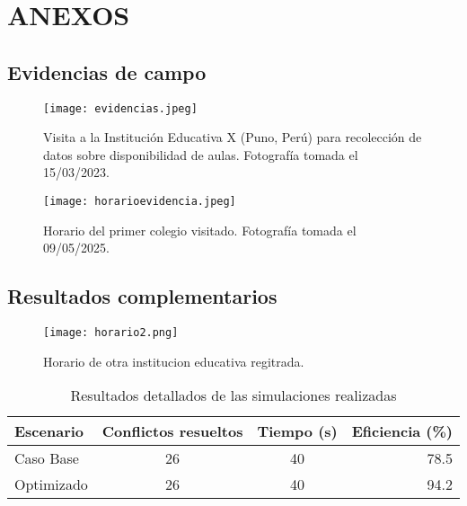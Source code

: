 \documentclass[12pt]{article}
\begin{document}
\section*{ANEXOS}
\setcounter{figure}{0} %
\renewcommand{\thefigure}{A.\arabic{figure}} %

\subsection*{Evidencias de campo}

\begin{figure}[h!]
\centering
\texttt{[image: evidencias.jpeg]}
\caption{Visita a la Institución Educativa X (Puno, Perú) para recolección de datos sobre disponibilidad de aulas. Fotografía tomada el 15/03/2023.}
\label{fig:anexo1}
\end{figure}

\begin{figure}[h!]
\centering
\texttt{[image: horarioevidencia.jpeg]}
\caption{Horario del primer colegio visitado. Fotografía tomada el 09/05/2025.}
\label{fig:anexo2}
\end{figure}

\subsection*{Resultados complementarios}

\begin{figure}[h!]
\centering
\texttt{[image: horario2.png]}
\caption{Horario de otra institucion educativa regitrada.}
\label{fig:anexo3}
\end{figure}

\begin{table}[h!]
\centering
\caption{Resultados detallados de las simulaciones realizadas}
\label{tab:anexo1}
\begin{tabular}{lccr}
\toprule
\textbf{Escenario} & \textbf{Conflictos resueltos} & \textbf{Tiempo (s)} & \textbf{Eficiencia (\%)} \\
\midrule
Caso Base & 26 & 40 & 78.5 \\
Optimizado & 26 & 40 & 94.2 \\
\bottomrule
\end{tabular}
\end{table}
\end{document}
